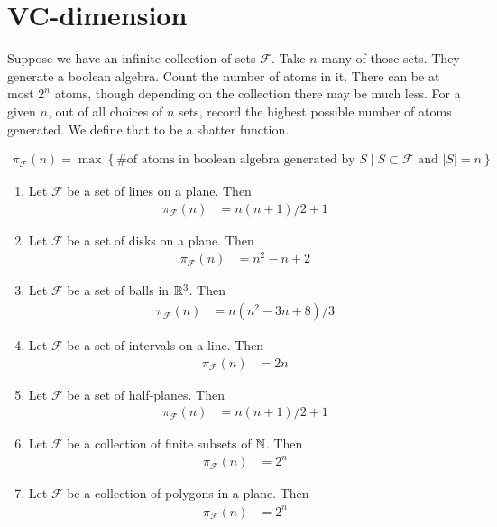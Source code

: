 \documentclass{amsart}
\newcommand{\F}{\mathcal F}
\newcommand{\curly}[1]{\left\{ #1 \right\}}
\begin{document}
\section{VC-dimension}

Suppose we have an infinite collection of sets $\F$.
Take $n$ many of those sets.
They generate a boolean algebra.
Count the number of atoms in it.
There can be at most $2^n$ atoms, though depending on the collection there may be much less.
For a given $n$, out of all choices of $n$ sets, record the highest possible number of atoms generated.
We define that to be a shatter function.

\begin{Definition}
	\begin{align*}
		\pi_\F(n) = \max \curly{ \text {\# of atoms in boolean algebra generated by $S$} \mid S \subset \F \text{ and } |S| = n}
	\end{align*}
\end{Definition}

\begin{Example}
	\begin{enumerate}
		\item Let $\F$ be a set of lines on a plane. Then
		\begin{align*}
			\pi_\F(n) &= n(n+1)/2 + 1
		\end{align*}
		\item Let $\F$ be a set of disks on a plane. Then
		\begin{align*}
			\pi_\F(n) &= n^2 - n + 2
		\end{align*}
		\item Let $\F$ be a set of balls in $\mathbb{R}^3$. Then
		\begin{align*}
			\pi_\F(n) &= n(n^2 - 3n + 8)/3
		\end{align*}
		\item Let $\F$ be a set of intervals on a line. Then
		\begin{align*}
			\pi_\F(n) &= 2n
		\end{align*}
		\item Let $\F$ be a set of half-planes. Then
		\begin{align*}
			\pi_\F(n) &= n(n+1)/2 + 1
		\end{align*}
		\item Let $\F$ be a collection of finite subsets of $\mathbb{N}$. Then
		\begin{align*}
			\pi_\F(n) &= 2^n
		\end{align*}
		\item Let $\F$ be a collection of polygons in a plane. Then
		\begin{align*}
			\pi_\F(n) &= 2^n
		\end{align*}
	\end{enumerate}
\end{Example}
\end{document}
